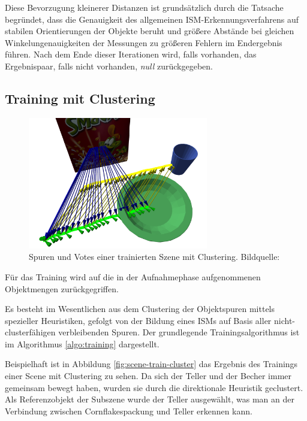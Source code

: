 Diese Bevorzugung kleinerer Distanzen ist grundsätzlich durch die Tatsache begründet, dass die Genauigkeit des allgemeinen ISM-Erkennungsverfahrens auf stabilen Orientierungen der Objekte beruht und größere Abstände bei gleichen Winkelungenauigkeiten der Messungen zu größeren Fehlern im Endergebnis führen.
Nach dem Ende dieser Iterationen wird, falls vorhanden, das Ergebnispaar, falls nicht vorhanden, \textit{null} zurückgegeben.

\subsection{Training mit Clustering}

\begin{figure}
  \centering
  \includegraphics[width=0.7\textwidth]{./bilder/paper_fotos/fruhstuck-cluster.png}
  \caption{Spuren und Votes einer trainierten Szene mit Clustering. Bildquelle: \cite{P.MeissnerandR.RecklingandR.JaekelandS.R.Schmidt-RohrandR.Dillmann2013}}\label{fig:scene-train-cluster}
\end{figure}

Für das Training wird auf die in der Aufnahmephase aufgenommenen Objektmengen zurückgegriffen.

Es besteht im Wesentlichen aus dem Clustering der Objektspuren mittels spezieller Heuristiken, gefolgt von der Bildung eines ISMs auf Basis aller nicht-clusterfähigen verbleibenden Spuren.
Der grundlegende Trainingsalgorithmus ist im Algorithmus \vref{algo:training} dargestellt.

Beispielhaft ist in Abbildung \vref{fig:scene-train-cluster} das Ergebnis des Trainings einer Scene mit Clustering zu sehen.
Da sich der Teller und der Becher immer gemeinsam bewegt haben, wurden sie durch die direktionale Heuristik geclustert. Als Referenzobjekt der Subszene wurde der Teller ausgewählt, was man an der Verbindung zwischen Cornflakespackung und Teller erkennen kann.

